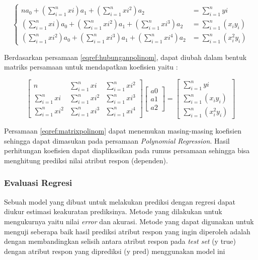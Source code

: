 		
		\begin{equation}
		\begin{cases}
		  
		   	na_0 + (\sum_{i=1}^{n}xi) a_1 + (\sum_{i=1}^{n}xi ^2)a_2 &= \sum_{i = 1}^{n} yi \\
		   		(\sum_{i=1}^{n}xi) a_0 + (\sum_{i=1}^{n}xi^2)a_1 + (\sum_{i=1}^{n} xi^3)a_2 &= \sum_{i=1}^{n} (x_i y_i) \\
		   		(\sum_{i=1}^{n} xi^2)a_0 + (\sum_{i=1}^{n} xi^3)a_1 + (\sum_{i=1}^{n}xi^4)a_2 &= \sum_{i=1}^{n}(x_i^2 y_i)
		   
		\end{cases}
		\label{eqref:hubunganpolinom}
	   \end{equation}
		
Berdasarkan persamaan \ref{eqref:hubunganpolinom}, dapat diubah dalam bentuk matriks persamaan untuk mendapatkan koefisien yaitu : 
		
		\begin{equation}
			\begin{bmatrix}
			n & \sum_{i=1}^{n}xi & \sum_{i=1}^{n}xi ^2 \\
			\sum_{i=1}^{n}xi & \sum_{i=1}^{n}xi^2 & \sum_{i=1}^{n} xi^3 \\
			\sum_{i=1}^{n} xi^2 & \sum_{i=1}^{n} xi^3 & \sum_{i=1}^{n}xi^4
			\end{bmatrix}
			\begin{bmatrix}
			a0 \\ 
			a1 \\ 
			a2
			\end{bmatrix}
			=
			\begin{bmatrix}
				 \sum_{i = 1}^{n} yi \\
				 \sum_{i=1}^{n} (x_i y_i) \\
				 \sum_{i=1}^{n}(x_i^2 y_i)
			\end{bmatrix}
			\label{eqref:matrixpolinom}
		\end{equation}
		
Persamaan \eqref{eqref:matrixpolinom} dapat menemukan masing-masing koefisien sehingga dapat dimasukan pada persamaan \textit{Polynomial Regression}. Hasil perhitungan koefisien dapat diaplikasikan pada rumus persamaan sehingga bisa menghitung prediksi nilai atribut respon (dependen).



\subsubsection{Evaluasi Regresi}
\label{chap:evaluasiregresi}
Sebuah model yang dibuat untuk melakukan prediksi dengan regresi dapat diukur estimasi keakuratan prediksinya. Metode yang dilakukan untuk mengukurnya yaitu nilai \textit{error} dan akurasi. Metode yang dapat digunakan untuk menguji seberapa baik hasil prediksi atribut respon yang ingin diperoleh adalah dengan membandingkan selisih antara atribut respon pada \textit{test set} (y true) dengan atribut respon yang diprediksi (y pred) menggunakan model ini

